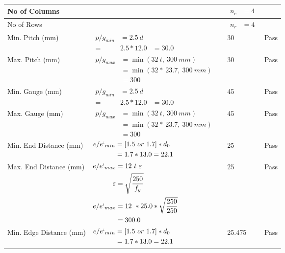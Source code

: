 \documentclass{article}%
\begin{document}
\begin{longtable}{|p{4cm}|p{5cm}|p{5.5cm}|p{1.5cm}|}
No of Columns&&$\begin{aligned} n_c &=4\end{aligned}$&\\%
\hline%
No of Rows&&$\begin{aligned} n_r &=4\end{aligned}$&\\%
\hline%
Min. Pitch (mm)&$\begin{aligned}p/g_{min}&= 2.5 ~ d&\\ =&2.5*12.0&=30.0\end{aligned}$&30&Pass\\%
\hline%
Max. Pitch (mm)&$\begin{aligned}p/g_{max} &=\min(32~t,~300~mm)&\\ &=\min(32 *~23.7,~ 300 ~mm)\\&=300\end{aligned}$&30&Pass\\%
\hline%
Min. Gauge (mm)&$\begin{aligned}p/g_{min}&= 2.5 ~ d&\\ =&2.5*12.0&=30.0\end{aligned}$&45&Pass\\%
\hline%
Max. Gauge (mm)&$\begin{aligned}p/g_{max} &=\min(32~t,~300~mm)&\\ &=\min(32 *~23.7,~ 300 ~mm)\\&=300\end{aligned}$&45&Pass\\%
\hline%
Min. End Distance (mm)&$\begin{aligned}e/e`_{min} &=[1.5~or~ 1.7] * d_0\\ &=1.7*13.0=22.1 \end{aligned}$&25&Pass\\%
\hline%
Max. End Distance (mm)&$\begin{aligned}e/e`_{max} &= 12~ t~ \varepsilon&\\ \varepsilon &= \sqrt{\frac{250}{f_y}}\\ e/e`_{max}&=12 ~*25.0*\sqrt{\frac{250}{250}}\\ &=300.0\\ \end{aligned}$&25&Pass\\%
\hline%
Min. Edge Distance (mm)&$\begin{aligned}e/e`_{min} &=[1.5~or~ 1.7] * d_0\\ &=1.7*13.0=22.1 \end{aligned}$&25.475&Pass\\%

\end{longtable}
\end{document}
